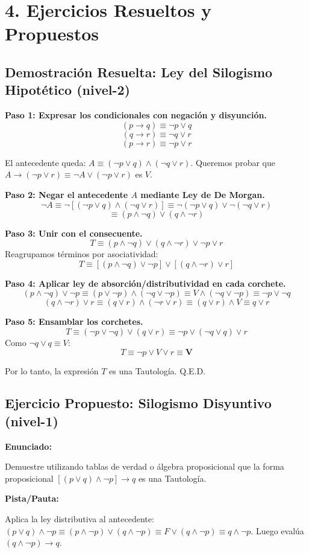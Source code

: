 \documentclass[11pt]{article}
\newenvironment{ejercicios}{\section*{4. Ejercicios Resueltos y Propuestos}}{}
\newcommand{\enunciado}[1]{\textbf{Enunciado:}\par#1\par\medskip}
\newenvironment{ejerciciodemostracion}[2]{\subsection*{Demostración Resuelta: #1 \hfill \normalfont\small(#2)}}{}
\newenvironment{ejerciciopropuesto}[2]{\subsection*{Ejercicio Propuesto: #1 \hfill \normalfont\small(#2)}}{}
\newcommand{\pista}[1]{\textbf{Pista/Pauta:}\par#1\par\bigskip}
\begin{document}
\begin{ejercicios}
\begin{ejerciciodemostracion}{Ley del Silogismo Hipotético}{nivel-2}
{      \textbf{Paso 1: Expresar los condicionales con negación y disyunción.}
      $$ (p \rightarrow q) \equiv \neg p \vee q $$
      $$ (q \rightarrow r) \equiv \neg q \vee r $$
      $$ (p \rightarrow r) \equiv \neg p \vee r $$
      
      El antecedente queda: $A \equiv (\neg p \vee q) \wedge (\neg q \vee r)$.
      Queremos probar que $A \rightarrow (\neg p \vee r) \equiv \neg A \vee (\neg p \vee r)$ es $V$.
      
      \textbf{Paso 2: Negar el antecedente $A$ mediante Ley de De Morgan.}
      $$ \neg A \equiv \neg [(\neg p \vee q) \wedge (\neg q \vee r)] \equiv \neg(\neg p \vee q) \vee \neg(\neg q \vee r) $$
      $$ \equiv (p \wedge \neg q) \vee (q \wedge \neg r) $$
      
      \textbf{Paso 3: Unir con el consecuente.}
      $$ T \equiv (p \wedge \neg q) \vee (q \wedge \neg r) \vee \neg p \vee r $$
      Reagrupamos términos por asociatividad:
      $$ T \equiv [(p \wedge \neg q) \vee \neg p] \vee [(q \wedge \neg r) \vee r] $$
      
      \textbf{Paso 4: Aplicar ley de absorción/distributividad en cada corchete.}
      $$ (p \wedge \neg q) \vee \neg p \equiv (p \vee \neg p) \wedge (\neg q \vee \neg p) \equiv V \wedge (\neg q \vee \neg p) \equiv \neg p \vee \neg q $$
      $$ (q \wedge \neg r) \vee r \equiv (q \vee r) \wedge (\neg r \vee r) \equiv (q \vee r) \wedge V \equiv q \vee r $$
      
      \textbf{Paso 5: Ensamblar los corchetes.}
      $$ T \equiv (\neg p \vee \neg q) \vee (q \vee r) \equiv \neg p \vee (\neg q \vee q) \vee r $$
      Como $\neg q \vee q \equiv V$:
      $$ T \equiv \neg p \vee V \vee r \equiv \mathbf{V} $$
      
      Por lo tanto, la expresión $T$ es una Tautología. Q.E.D.
    }
  \end{ejerciciodemostracion}

  \begin{ejerciciopropuesto}{Silogismo Disyuntivo}{nivel-1}
    \enunciado{
      Demuestre utilizando tablas de verdad o álgebra proposicional que la forma proposicional $[(p \vee q) \wedge \neg p] \rightarrow q$ es una Tautología.
    }
    \pista{
      Aplica la ley distributiva al antecedente: $(p \vee q) \wedge \neg p \equiv (p \wedge \neg p) \vee (q \wedge \neg p) \equiv F \vee (q \wedge \neg p) \equiv q \wedge \neg p$. Luego evalúa $(q \wedge \neg p) \rightarrow q$.
    }
  \end{ejerciciopropuesto}


\end{ejercicios}
\end{document}
